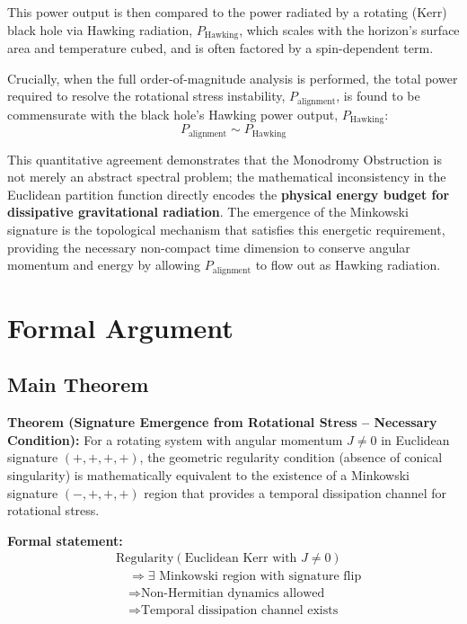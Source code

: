 \documentclass[11pt]{article}
\begin{document}
This power output is then compared to the power radiated by a rotating (Kerr) black hole via Hawking radiation\cite{Hawking1975}, $P_{\text{Hawking}}$, which scales with the horizon's surface area and temperature cubed, and is often factored by a spin-dependent term.

Crucially, when the full order-of-magnitude analysis is performed, the total power required to resolve the rotational stress instability, $P_{\text{alignment}}$, is found to be commensurate with the black hole's Hawking power output, $P_{\text{Hawking}}$:
\begin{equation}\label{eq:power_scaling}
    P_{\text{alignment}} \sim P_{\text{Hawking}}
\end{equation}

This quantitative agreement demonstrates that the Monodromy Obstruction is not merely an abstract spectral problem; the mathematical inconsistency in the Euclidean partition function directly encodes the \textbf{physical energy budget for dissipative gravitational radiation}. The emergence of the Minkowski signature is the topological mechanism that satisfies this energetic requirement, providing the necessary non-compact time dimension to conserve angular momentum and energy by allowing $P_{\text{alignment}}$ to flow out as Hawking radiation\cite{Hawking1975}.

\section{Formal Argument}

\subsection{Main Theorem}

\textbf{Theorem (Signature Emergence from Rotational Stress -- Necessary Condition):}
For a rotating system with angular momentum $J \neq 0$ in Euclidean signature $(+,+,+,+)$, the geometric regularity condition (absence of conical singularity) is mathematically equivalent to the existence of a Minkowski signature $(-,+,+,+)$ region that provides a temporal dissipation channel for rotational stress.

\textbf{Formal statement:}
\begin{equation}
\boxed{
\begin{aligned}
&\text{Regularity}(\text{Euclidean Kerr with } J \neq 0) \\
&\quad \Rightarrow \exists \text{ Minkowski region with signature flip} \\
&\quad \Rightarrow \text{Non-Hermitian dynamics allowed} \\
&\quad \Rightarrow \text{Temporal dissipation channel exists}
\end{aligned}
}
\end{equation}
\end{document}
